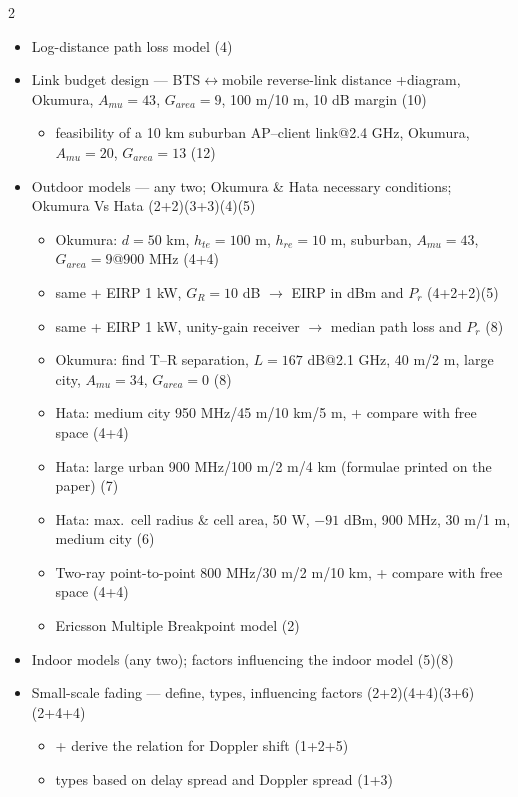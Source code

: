 \documentclass[10pt]{article}
\begin{document}
\begin{multicols}{2}
\begin{itemize}
  \item Log-distance path loss model \hfill (4)
  \item Link budget design --- BTS$\leftrightarrow$mobile reverse-link distance +diagram, Okumura, $A_{mu}{=}43$, $G_{area}{=}9$, 100 m/10 m, 10 dB margin \hfill (10)
    \begin{itemize}
      \item feasibility of a 10 km suburban AP--client link@2.4 GHz, Okumura, $A_{mu}{=}20$, $G_{area}{=}13$ \hfill (12)
    \end{itemize}
  \item Outdoor models --- any two; Okumura \& Hata necessary conditions; Okumura Vs Hata \hfill (2+2)(3+3)(4)(5)
    \begin{itemize}
      \item Okumura: $d{=}50$ km, $h_{te}{=}100$ m, $h_{re}{=}10$ m, suburban, $A_{mu}{=}43$, $G_{area}{=}9$@900 MHz \hfill (4+4)
      \item same + EIRP 1 kW, $G_R{=}10$ dB $\rightarrow$ EIRP in dBm and $P_r$ \hfill (4+2+2)(5)
      \item same + EIRP 1 kW, unity-gain receiver $\rightarrow$ median path loss and $P_r$ \hfill (8)
      \item Okumura: find T--R separation, $L{=}167$ dB@2.1 GHz, 40 m/2 m, large city, $A_{mu}{=}34$, $G_{area}{=}0$ \hfill (8)
      \item Hata: medium city 950 MHz/45 m/10 km/5 m, + compare with free space \hfill (4+4)
      \item Hata: large urban 900 MHz/100 m/2 m/4 km (formulae printed on the paper) \hfill (7)
      \item Hata: max.\ cell radius \& cell area, 50 W, $-91$ dBm, 900 MHz, 30 m/1 m, medium city \hfill (6)
      \item Two-ray point-to-point 800 MHz/30 m/2 m/10 km, + compare with free space \hfill (4+4)
      \item Ericsson Multiple Breakpoint model \hfill (2)
    \end{itemize}
  \item Indoor models (any two); factors influencing the indoor model \hfill (5)(8)
  \item Small-scale fading --- define, types, influencing factors \hfill (2+2)(4+4)(3+6)(2+4+4)
    \begin{itemize}
      \item + derive the relation for Doppler shift \hfill (1+2+5)
      \item types based on delay spread and Doppler spread \hfill (1+3)

\end{itemize}
\end{itemize}
\end{multicols}
\end{document}

